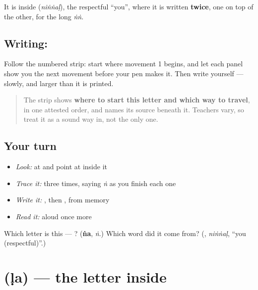 It is inside \textbf{} (\emph{niṅṅaḷ}), the respectful \textquotedblleft{}you\textquotedblright{}, where it is written \textbf{twice}, one on top of the other, for the long \emph{ṅṅ}.

\subsection*{Writing: }

Follow the numbered strip: start where movement 1 begins, and let each panel show you the next movement before your pen makes it. Then write  yourself — slowly, and larger than it is printed.

\begin{quote}
The strip shows \textbf{where to start this letter and which way to travel}, in one attested order, and names its source beneath it. Teachers vary, so treat it as a sound way in, not the only one.
\end{quote}

\subsection*{Your turn}
\begin{itemize}
\raggedright
  \item \emph{Look:} at \textbf{} and point at  inside it
  \item \emph{Trace it:}  three times, saying \emph{ṅ} as you finish each one
  \item \emph{Write it:} , then , from memory
  \item \emph{Read it:} \textbf{} aloud once more
\end{itemize}

\begin{tcolorbox}[breakable,colback=teal!4,colframe=teal!35!black,title={Before you move on}]
Which letter is this — ? (\textbf{ṅa}, \emph{ṅ}.) Which word did it come from? (\textbf{}, \emph{niṅṅaḷ}, \textquotedblleft{}you (respectful)\textquotedblright{}.)
\end{tcolorbox}
\section[\texorpdfstring{\ml{ള} (ḷa)}{ള (ḷa)}]{ (ḷa) — the letter inside }

